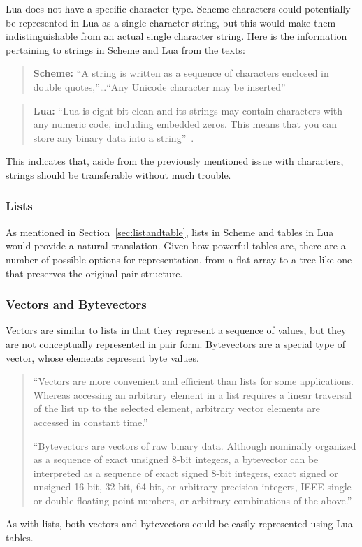 Lua does not have a specific character type. Scheme characters could potentially
be represented in Lua as a single character string, but this would make them
indistinguishable from an actual single character string. Here is the
information pertaining to strings in Scheme and Lua from the texts:

\begin{quotation}\textbf{Scheme:}
``A string is written as a sequence of characters enclosed in double
quotes,''\ldots ``Any Unicode character may be inserted''~\cite[Sec~6.8]{tspl}
\end{quotation}

\begin{quotation}\textbf{Lua:}
``Lua is eight-bit clean and its strings may contain characters with any numeric
code, including embedded zeros. This means that you can store any binary data
into a string''~\cite[p.11]{luabook}.
\end{quotation}

This indicates that, aside from the previously mentioned issue with characters, strings should be transferable without much trouble.

\subsubsection{Lists}

As mentioned in Section~\ref{sec:listandtable}, lists in Scheme and tables in
Lua would provide a natural translation. Given how powerful tables are, there
are a number of possible options for representation, from a flat array to a
tree-like one that preserves the original pair structure.

\subsubsection{Vectors and Bytevectors}

Vectors are similar to lists in that they represent a sequence of values, but
they are not conceptually represented in pair form. Bytevectors are a special
type of vector, whose elements represent byte values.
\begin{quotation}
``Vectors are more convenient and efficient than lists for some applications.
Whereas accessing an arbitrary element in a list requires a linear traversal of
the list up to the selected element, arbitrary vector elements are accessed in
constant time.''~\cite[Sec~6.9]{tspl}

``Bytevectors are vectors of raw binary data. Although nominally organized as a
sequence of exact unsigned 8-bit integers, a bytevector can be interpreted as a
sequence of exact signed 8-bit integers, exact signed or unsigned 16-bit,
32-bit, 64-bit, or arbitrary-precision integers, IEEE single or double
floating-point numbers, or arbitrary combinations of the
above.''~\cite[Sec~6.10]{tspl}
\end{quotation} 
As with lists, both vectors and bytevectors could be easily represented using Lua tables.

